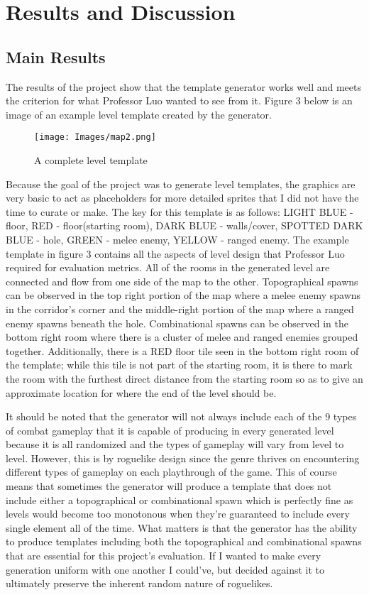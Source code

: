 \documentclass[10pt,twocolumn]{article}
\begin{document}
\section{Results and Discussion}

\subsection{Main Results}

The results of the project show that the template generator works well and meets the criterion for what Professor Luo wanted to see from it. Figure 3 below is an image of an example level template created by the generator.

\begin{figure}[h]
\centering
\texttt{[image: Images/map2.png]}
\caption{A complete level template}
\label{fig:x example template 1}
\end{figure}

Because the goal of the project was to generate level templates, the graphics are very basic to act as placeholders for more detailed sprites that I did not have the time to curate or make. The key for this template is as follows: LIGHT BLUE - floor, RED - floor(starting room), DARK BLUE - walls/cover, SPOTTED DARK BLUE - hole, GREEN - melee enemy, YELLOW - ranged enemy. The example template in figure 3 contains all the aspects of level design that Professor Luo required for evaluation metrics. All of the rooms in the generated level are connected and flow from one side of the map to the other. Topographical spawns can be observed in the top right portion of the map where a melee enemy spawns in the corridor's corner and the middle-right portion of the map where a ranged enemy spawns beneath the hole. Combinational spawns can be observed in the bottom right room where there is a cluster of melee and ranged enemies grouped together. Additionally, there is a RED floor tile seen in the bottom right room of the template; while this tile is not part of the starting room, it is there to mark the room with the furthest direct distance from the starting room so as to give an approximate location for where the end of the level should be. 

It should be noted that the generator will not always include each of the 9 types of combat gameplay that it is capable of producing in every generated level because it is all randomized and the types of gameplay will vary from level to level. However, this is by roguelike design since the genre thrives on encountering different types of gameplay on each playthrough of the game. This of course means that sometimes the generator will produce a template that does not include either a topographical or combinational spawn which is perfectly fine as levels would become too monotonous when they're guaranteed to include every single element all of the time. What matters is that the generator has the ability to produce templates including both the topographical and combinational spawns that are essential for this project's evaluation. If I wanted to make every generation uniform with one another I could've, but decided against it to ultimately preserve the inherent random nature of roguelikes. 
\end{document}
